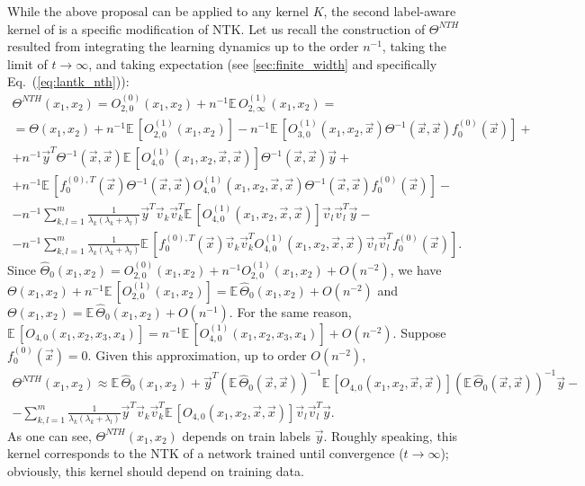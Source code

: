 \documentclass{article}
\newcommand{\EE}{\mathbb{E}\,}
\begin{document}
    While the above proposal can be applied to any kernel $K$, the second label-aware kernel of \cite{chen2020label} is a specific modification of NTK.
    Let us recall the construction of $\Theta^{NTH}$ resulted from integrating the learning dynamics up to the order $n^{-1}$, taking the limit of $t \to \infty$, and taking expectation (see \cref{sec:finite_width} and specifically Eq.~(\ref{eq:lantk_nth})):
    \begin{multline}
        \Theta^{NTH}(x_1,x_2)
        = O_{2,0}^{(0)}(x_1,x_2) + n^{-1} \EE O_{2,\infty}^{(1)}(x_1,x_2)
        =\\= \Theta(x_1,x_2) + n^{-1} \EE\left[O_{2,0}^{(1)}(x_1,x_2)\right] - n^{-1} \EE\left[O_{3,0}^{(1)}(x_1, x_2, \vec x) \Theta^{-1}(\vec x,\vec x) f_0^{(0)}(\vec x)\right]
        +\\+ n^{-1} \vec y^T \Theta^{-1}(\vec x,\vec x) \EE\left[O_{4,0}^{(1)}(x_1, x_2, \vec x, \vec x)\right] \Theta^{-1}(\vec x,\vec x) \vec y
        +\\+ n^{-1} \EE\left[f_0^{(0),T}(\vec x) \Theta^{-1}(\vec x,\vec x) O_{4,0}^{(1)}(x_1, x_2, \vec x, \vec x) \Theta^{-1}(\vec x,\vec x) f_0^{(0)}(\vec x)\right]
        -\\- n^{-1} \sum_{k,l=1}^m \frac{1}{\lambda_k (\lambda_k+\lambda_l)} \vec y^T \vec v_k \vec v_k^T \EE\left[O_{4,0}^{(1)}(x_1, x_2, \vec x, \vec x)\right] \vec v_l \vec v_l^T \vec y
        -\\- n^{-1} \sum_{k,l=1}^m \frac{1}{\lambda_k (\lambda_k+\lambda_l)} \EE\left[f_0^{(0),T}(\vec x) \vec v_k \vec v_k^T O_{4,0}^{(1)}(x_1, x_2, \vec x, \vec x) \vec v_l \vec v_l^T f_0^{(0)}(\vec x)\right].
    \end{multline}
    Since $\hat\Theta_0(x_1,x_2) = O_{2,0}^{(0)}(x_1,x_2) + n^{-1} O_{2,0}^{(1)}(x_1,x_2) + O(n^{-2})$, we have $\Theta(x_1,x_2) + n^{-1} \EE\left[O_{2,0}^{(1)}(x_1,x_2)\right] = \EE\hat\Theta_0(x_1,x_2) + O(n^{-2})$ and $\Theta(x_1,x_2) = \EE\hat\Theta_0(x_1,x_2) + O(n^{-1})$.
    For the same reason, $\EE\left[O_{4,0}(x_1, x_2, x_3, x_4)\right] = n^{-1} \EE\left[O_{4,0}^{(1)}(x_1, x_2, x_3, x_4)\right] + O(n^{-2})$.
    Suppose $f_0^{(0)}(\vec x) = 0$.
    Given this approximation, up to order $O(n^{-2})$,
    \begin{multline}
        \Theta^{NTH}(x_1,x_2)
        \approx \EE\hat\Theta_0(x_1,x_2) + \vec y^T \left(\EE\hat\Theta_0(\vec x,\vec x)\right)^{-1} \EE\left[O_{4,0}(x_1, x_2, \vec x, \vec x)\right] \left(\EE\hat\Theta_0(\vec x,\vec x)\right)^{-1} \vec y
        -\\- \sum_{k,l=1}^m \frac{1}{\lambda_k (\lambda_k+\lambda_l)} \vec y^T \vec v_k \vec v_k^T \EE\left[O_{4,0}(x_1, x_2, \vec x, \vec x)\right] \vec v_l \vec v_l^T \vec y.
    \end{multline}
    As one can see, $\Theta^{NTH}(x_1,x_2)$ depends on train labels $\vec y$.
    Roughly speaking, this kernel corresponds to the NTK of a network trained until convergence ($t\to\infty$); obviously, this kernel should depend on training data.
\end{document}
